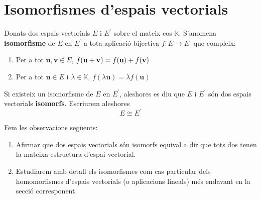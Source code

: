 \section{Isomorfismes d’espais vectorials}

\begin{definicio}
Donats dos espais vectorials $E$ i $E^{\prime }$ sobre
el mateix cos $\mathbb{K}$. S’anomena \textbf{isomorfisme} de $E$
en $E^{\prime }$ a tota aplicació bijectiva $f:E%
\rightarrow E^{\prime }$ que compleix:

\begin{enumerate}
\item Per a tot $\mathbf{u},\mathbf{v}\in E$, $f(\mathbf{u}+\mathbf{%
v})=f(\mathbf{u})+f(\mathbf{v})$

\item Per a tot $\mathbf{u}\in E$ i $\lambda \in \mathbb{K}$, $%
f(\lambda \mathbf{u})=\lambda f(\mathbf{u})$
\end{enumerate}

Si existeix un isomorfisme de $E$ en $E^{\prime }$, aleshores
es diu que $E$ i $E^{\prime }$ són dos espais
vectorials \textbf{isomorfs}. Escriurem aleshores%
\begin{equation*}
E\cong E^{\prime }
\end{equation*}
\end{definicio}

\begin{observacio}
Fem les observacions següents:

\begin{enumerate}
\item Afirmar que dos espais vectorials són isomorfs equival a dir
que tots dos tenen la mateixa estructura d’espai vectorial.

\item Estudiarem amb detall els isomorfismes com cas particular dels
homomorfismes d’espais vectorials (o aplicacions lineals) més
endavant en la secció corresponent.
\end{enumerate}
\end{observacio}

